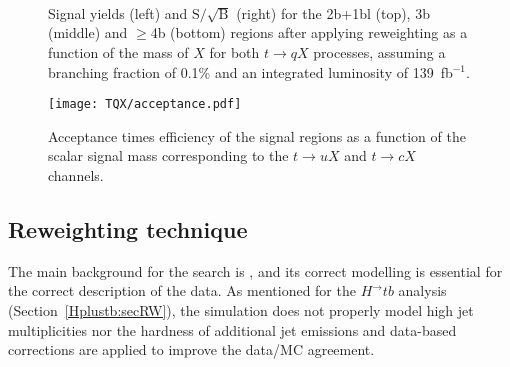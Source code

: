 \begin{figure}[htbp]
    \RawFloats
    \begin{center}
         \\
         \\
         \\
    \caption{
        Signal yields (left) and $\text{S}/\sqrt{\text{B}}$ (right) for the 2b+1bl (top), 3b (middle) and $\geq$4b (bottom) regions after applying reweighting as a function of the mass of $X$ for both $t\to qX$ processes, assuming a branching fraction of 0.1\% and an integrated luminosity of 139~fb$^{-1}$.
    }
    \label{tqX:signalyields}
    \end{center}
\end{figure}

\begin{figure}[htbp]
    \RawFloats
    \begin{center}
    \texttt{[image: TQX/acceptance.pdf]}
    \caption{
        Acceptance times efficiency of the signal regions as a function of the scalar signal mass corresponding to
the $t\to uX$ and $t\to cX$ channels.
    }
    \label{tqX:acceptance}
    \end{center}
\end{figure}

\clearpage
\subsection{Reweighting technique}
\label{tqX:secRW}
The main background for the search is \ttjets, and its correct modelling is essential for the correct description of the data. As mentioned for the $H^\to tb$ analysis (Section~\ref{Hplustb:secRW}), the simulation does not properly model high jet multiplicities nor the hardness of additional jet emissions and data-based corrections are applied to improve the data/MC agreement.

